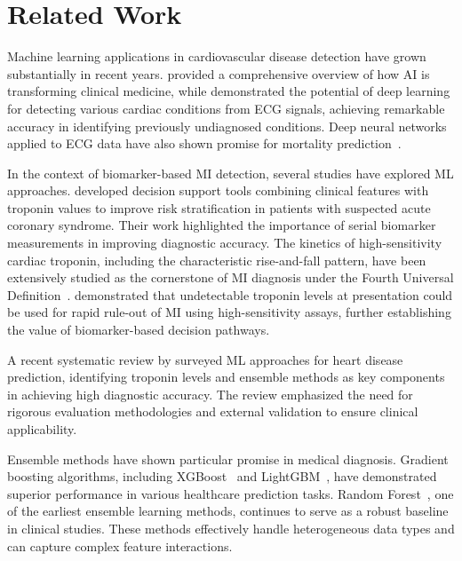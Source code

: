 \documentclass[fleqn,10pt,lineno]{wlpeerj}
\begin{document}
\section*{Related Work}

Machine learning applications in cardiovascular disease detection have grown substantially in recent years. \citet{Topol2019} provided a comprehensive overview of how AI is transforming clinical medicine, while \citet{Attia2019} demonstrated the potential of deep learning for detecting various cardiac conditions from ECG signals, achieving remarkable accuracy in identifying previously undiagnosed conditions. Deep neural networks applied to ECG data have also shown promise for mortality prediction~\citep{Raghunath2020}.

In the context of biomarker-based MI detection, several studies have explored ML approaches. \citet{Than2019} developed decision support tools combining clinical features with troponin values to improve risk stratification in patients with suspected acute coronary syndrome. Their work highlighted the importance of serial biomarker measurements in improving diagnostic accuracy. The kinetics of high-sensitivity cardiac troponin, including the characteristic rise-and-fall pattern, have been extensively studied as the cornerstone of MI diagnosis under the Fourth Universal Definition~\citep{Chapman2020, Collet2021}. \citet{Body2021} demonstrated that undetectable troponin levels at presentation could be used for rapid rule-out of MI using high-sensitivity assays, further establishing the value of biomarker-based decision pathways.

A recent systematic review by \citet{Alahmadi2024} surveyed ML approaches for heart disease prediction, identifying troponin levels and ensemble methods as key components in achieving high diagnostic accuracy. The review emphasized the need for rigorous evaluation methodologies and external validation to ensure clinical applicability.

Ensemble methods have shown particular promise in medical diagnosis. Gradient boosting algorithms, including XGBoost~\citep{Chen2016} and LightGBM~\citep{Ke2017}, have demonstrated superior performance in various healthcare prediction tasks. Random Forest~\citep{Breiman2001}, one of the earliest ensemble learning methods, continues to serve as a robust baseline in clinical studies. These methods effectively handle heterogeneous data types and can capture complex feature interactions.
\end{document}

